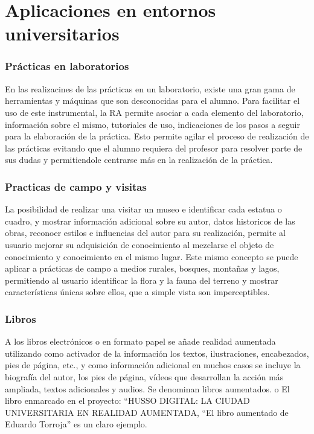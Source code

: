 \section{Aplicaciones en entornos universitarios}

\subsubsection{Prácticas en laboratorios} 
En las realizacines de las prácticas en un laboratorio, existe una gran gama de herramientas y máquinas que son desconocidas para el alumno. Para facilitar el uso de este instrumental, la RA permite asociar a cada elemento del laboratorio, información sobre el mismo, tutoriales de uso, indicaciones de los pasos a seguir para la elaboración de la práctica. Esto permite agilar el proceso de realización de las prácticas evitando que el alumno requiera del profesor para resolver parte de sus dudas y permitiendole centrarse más en la realización de la práctica.

\subsubsection{Practicas de campo y visitas} 

La posibilidad de realizar una visitar un museo e identificar cada estatua o cuadro, y mostrar información adicional sobre su autor, datos historicos de las obras, reconoer estilos e influencias del autor para su realización, permite al usuario mejorar su adquisición de conocimiento al mezclarse el objeto de conocimiento y conocimiento en el mismo lugar. Este mismo concepto se puede aplicar a prácticas de campo a medios rurales, bosques, montañas y lagos, permitiendo al usuario identificar la flora y la fauna del terreno y mostrar características únicas sobre ellos, que a simple vista son imperceptibles.
 
\subsubsection{Libros}
A los libros electrónicos o en formato papel se añade realidad aumentada utilizando como activador de la información los textos, ilustraciones, encabezados, pies de página, etc., y como información adicional en muchos casos se incluye la biografía del autor, los pies de página, vídeos que desarrollan la acción más ampliada, textos adicionales y audios. Se denominan libros aumentados.
o El libro enmarcado en el proyecto: “HUSSO DIGITAL: LA CIUDAD UNIVERSITARIA EN REALIDAD AUMENTADA, “El libro aumentado de Eduardo Torroja” es un claro ejemplo.

